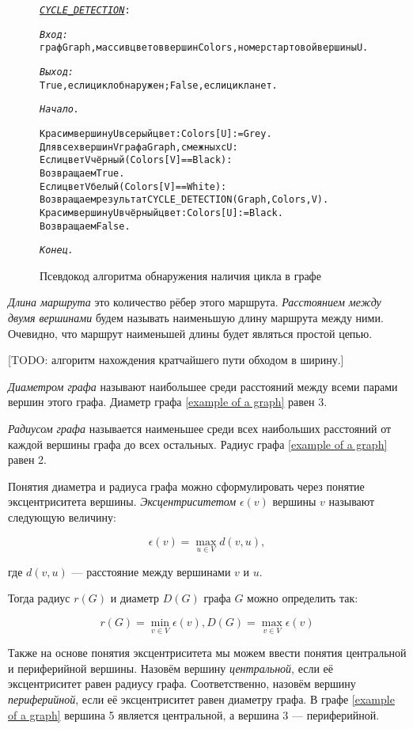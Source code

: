 \begin{figure}[h]
\begin{alltt}
\textit{\underline{CYCLE\_DETECTION}}:

\textit{Вход:}
  граф Graph, массив цветов вершин Colors, номер стартовой вершины U.

\textit{Выход:}
  True, если цикл обнаружен; False, если цикла нет.

\textit{Начало.}

  Красим вершину U в серый цвет: Colors[U] := Grey.
  Для всех вершин V графа Graph, смежных с U:
    Если цвет V чёрный (Colors[V] == Black):
      Возвращаем True.
    Если цвет V белый (Colors[V] == White):
      Возвращаем результат CYCLE\_DETECTION(Graph, Colors, V).
  Красим вершину U в чёрный цвет: Colors[U] := Black.
  Возвращаем False.

\textit{Конец.}
\end{alltt}
\caption{Псевдокод алгоритма обнаружения наличия цикла в графе}
\label{dfs for cycle detection}
\end{figure}

\emph{Длина маршрута} это количество рёбер этого маршрута. \emph{Расстоянием 
между двумя вершинами} будем называть наименьшую длину маршрута между ними. 
Очевидно, что маршрут наименьшей длины будет являться простой цепью.

[TODO: алгоритм нахождения кратчайшего пути обходом в ширину.]

\emph{Диаметром графа} называют наибольшее среди расстояний между всеми парами 
вершин этого графа. Диаметр графа \ref{example of a graph} равен 3.

\emph{Радиусом графа} называется наименьшее среди всех наибольших расстояний от
каждой вершины графа до всех остальных. Радиус графа \ref{example of a graph} 
равен 2.

Понятия диаметра и радиуса графа можно сформулировать через понятие 
эксцентриситета вершины. \emph{Эксцентриситетом} $\epsilon (v)$ вершины $v$ 
называют следующую величину:

\[\epsilon (v) = \max_{u \in V} d(v,u),\]

где $d(v,u)$ --- расстояние между вершинами $v$ и $u$.

Тогда радиус $r(G)$ и диаметр $D(G)$ графа $G$ можно определить так:

\[r(G) = \min_{v \in V}\epsilon (v), D(G) = \max_{v \in V}\epsilon (v)\]

Также на основе понятия эксцентриситета мы можем ввести понятия центральной и 
периферийной вершины. Назовём вершину \emph{центральной}, если её 
эксцентриситет равен радиусу графа. Соответственно, назовём вершину 
\emph{периферийной}, если её эксцентриситет равен диаметру графа. В графе 
\ref{example of a graph} вершина 5 является центральной, а вершина 3 --- 
периферийной.

